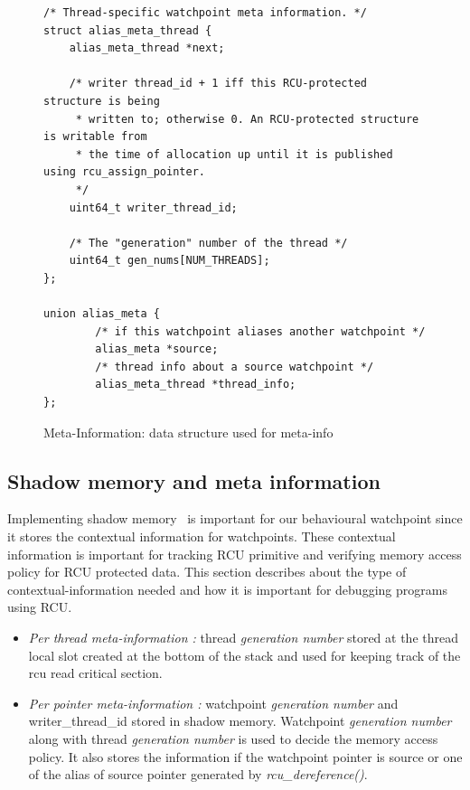 \begin{figure}[htb]
\begin{lstlisting}
/* Thread-specific watchpoint meta information. */
struct alias_meta_thread {
    alias_meta_thread *next;

    /* writer thread_id + 1 iff this RCU-protected structure is being
     * written to; otherwise 0. An RCU-protected structure is writable from
     * the time of allocation up until it is published using rcu_assign_pointer.
     */
    uint64_t writer_thread_id;

    /* The "generation" number of the thread */
    uint64_t gen_nums[NUM_THREADS];
};

union alias_meta {
        /* if this watchpoint aliases another watchpoint */
        alias_meta *source;
        /* thread info about a source watchpoint */
        alias_meta_thread *thread_info;
}; 
\end{lstlisting}
\caption{Meta-Information: data structure used for meta-info}\label{fig:metainfo}
\end{figure}

\subsection{Shadow memory and meta information}
Implementing shadow memory~\cite{Memcheck} is important for our behavioural watchpoint since it stores the contextual information for watchpoints. These contextual information is important for tracking RCU primitive and verifying memory access policy for RCU protected data. This section describes about the type of contextual-information needed and how it is important for debugging programs using RCU.
\begin{itemize}
 	\item \emph{Per thread meta-information :} thread \emph{generation number} stored at the thread local slot created at the bottom of the stack and used for keeping track of the rcu read critical section.%
   	\item \emph{Per pointer meta-information :} watchpoint \emph{generation number} and writer\_thread\_id stored in shadow memory.  Watchpoint \emph{generation number} along with thread \emph{generation number} is used to decide the memory access policy. It also stores the information if the watchpoint pointer is source or one of the alias of source pointer generated by \emph{rcu\_dereference()}. %
\end{itemize} 

